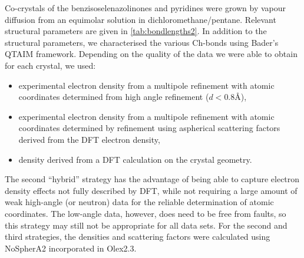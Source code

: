 \begin{refsection}

Co-crystals of the benzisoselenazolinones and pyridines were grown by vapour diffusion from an equimolar solution in dichloromethane/pentane.
Relevant structural parameters are given in \cref{tab:bondlengths2}.
In addition to the structural parameters, we characterised the various Ch-bonds using Bader's QTAIM framework.
Depending on the quality of the data we were able to obtain for each crystal, we used:

\begin{itemize}
    \item experimental electron density from a multipole refinement with atomic coordinates determined from high angle refinement ($d < 0.8$\AA),
    \item experimental electron density from a multipole refinement with atomic coordinates determined by refinement using aspherical scattering factors derived from the DFT electron density,
    \item density derived from a DFT calculation on the crystal geometry.
\end{itemize}

The second ``hybrid'' strategy has the advantage of being able to capture electron density effects not fully described by DFT, while not requiring a large amount of weak high-angle (or neutron) data for the reliable determination of atomic coordinates.
The low-angle data, however, does need to be free from faults, so this strategy may still not be appropriate for all data sets.
For the second and third strategies, the densities and scattering factors were calculated using NoSpherA2 incorporated in Olex2.3.\autocite{Kleemiss2021}


\end{refsection}
